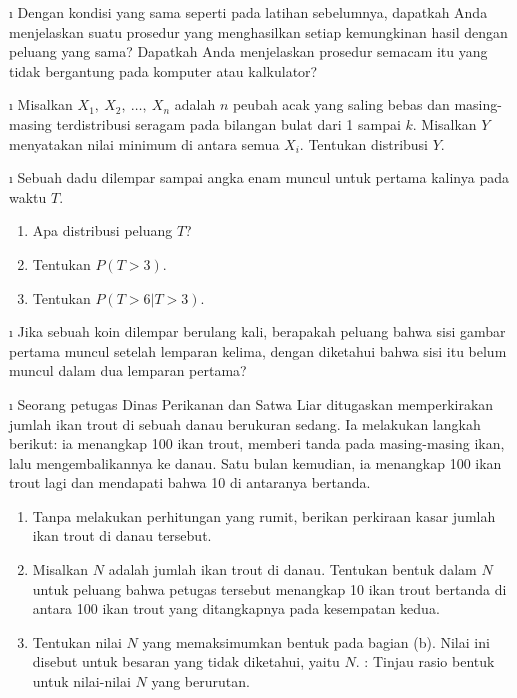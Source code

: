 \begin{LJSItem}
\i\label{exer 5.1.104} Dengan kondisi yang sama seperti pada latihan sebelumnya,
dapatkah Anda menjelaskan suatu prosedur yang menghasilkan setiap kemungkinan hasil
dengan peluang yang sama? Dapatkah Anda menjelaskan prosedur semacam itu yang tidak
bergantung pada komputer atau kalkulator?

\i\label{exer 5.1.105} Misalkan $X_1,\ X_2,\ \ldots,\ X_n$ adalah $n$ peubah acak
yang saling bebas dan masing-masing terdistribusi seragam pada bilangan bulat dari 1
sampai $k$. Misalkan $Y$ menyatakan nilai minimum di antara semua $X_i$. Tentukan
distribusi $Y$.

\i\label{exer 5.1.16} Sebuah dadu dilempar sampai angka enam muncul untuk pertama
kalinya pada waktu $T$.
\begin{enumerate}

\item Apa distribusi peluang $T$?

\item Tentukan $P(T > 3)$.

\item Tentukan $P(T > 6 | T > 3)$.
\end{enumerate}

\i\label{5.1.18} Jika sebuah koin dilempar berulang kali, berapakah peluang bahwa
sisi gambar pertama muncul setelah lemparan kelima, dengan diketahui bahwa sisi itu
belum muncul dalam dua lemparan pertama?

\i\label{exer 5.1.106} Seorang petugas Dinas Perikanan dan Satwa Liar ditugaskan
memperkirakan jumlah ikan trout di sebuah danau berukuran sedang.
Ia melakukan langkah berikut: ia menangkap 100 ikan trout, memberi tanda pada
masing-masing ikan, lalu mengembalikannya ke danau. Satu bulan kemudian, ia menangkap
100 ikan trout lagi dan mendapati bahwa 10 di antaranya bertanda.  
\begin{enumerate}
\item Tanpa melakukan perhitungan yang rumit, berikan perkiraan kasar jumlah ikan
trout di danau tersebut.
\item Misalkan $N$ adalah jumlah ikan trout di danau. Tentukan bentuk dalam $N$ untuk
peluang bahwa petugas tersebut menangkap 10 ikan trout bertanda di antara 100 ikan
trout yang ditangkapnya pada kesempatan kedua.
\item Tentukan nilai $N$ yang memaksimumkan bentuk pada bagian (b). Nilai ini disebut
 untuk besaran
yang tidak diketahui, yaitu $N$. : Tinjau rasio bentuk untuk nilai-nilai
$N$ yang berurutan.
\end{enumerate}


\end{LJSItem}
